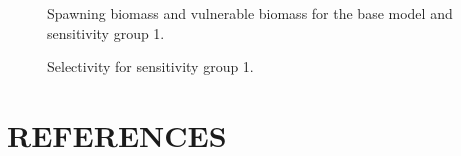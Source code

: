 \documentclass[11pt]{book}
\begin{document}
\begin{figure}[H]

{\centering {} 

}

\caption{Spawning biomass and vulnerable biomass for the base model and sensitivity group 1.}\label{fig:fig-sens-sel-eq-mat-vuln}
\end{figure}







\begin{figure}[H]

{\centering {} 

}

\caption{Selectivity for sensitivity group 1.}\label{fig:fig-sens-qcs-tv}
\end{figure}
\clearpage

\clearpage

\hypertarget{references}{%
\section*{REFERENCES}\label{references}}
\end{document}

